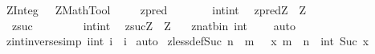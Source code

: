 %
\begin{isabellebody}%
\def\isabellecontext{ZInteg}%
%
\isamarkuptrue%
%
\isadelimtheory
%
\endisadelimtheory
%
\isatagtheory
{}\isamarkupfalse%
\ ZInteg\ \ \ ZMathTool\ %
\endisatagtheory
{\isafoldtheory}%
%
\isadelimtheory
%
\endisadelimtheory
\ \isanewline
\isanewline
{}\isamarkupfalse%
\isanewline
\ \ zpred\ \ \ \ \ \ \ {\isacharcolon}{\isacharcolon}\ {\isachardoublequoteopen}int{\isacharequal}{\isachargreater}int{\isachardoublequoteclose}\isanewline
\ \ {\isachardoublequoteopen}zpred{\isacharparenleft}Z{\isacharparenright}\ {\isacharequal}{\isacharequal}\ Z\ {\isacharminus}\ {}{\isachardoublequoteclose}\isanewline
\isanewline
\ \ zsuc\ \ \ \ \ \ \ \ {\isacharcolon}{\isacharcolon}\ {\isachardoublequoteopen}int{\isacharequal}{\isachargreater}int{\isachardoublequoteclose}\isanewline
\ \ {\isachardoublequoteopen}zsuc{\isacharparenleft}Z{\isacharparenright}\ {\isacharequal}{\isacharequal}\ Z\ {\isacharplus}\ {}{\isachardoublequoteclose}%
\isamarkuptrue%
\isamarkupfalse%
\ znat{\isacharunderscore}bin{\isacharunderscore}{}{\isacharcolon}\ {\isachardoublequoteopen}{\isacharparenleft}int\ {}{\isacharparenright}\ {\isacharequal}\ {}{\isachardoublequoteclose}\isanewline
%
\isadelimproof
%
\endisadelimproof
%
\isatagproof
{}\isamarkupfalse%
\ auto\isanewline
{}\isamarkupfalse%
%
\endisatagproof
{\isafoldproof}%
%
\isadelimproof
\isanewline
%
\endisadelimproof
\isanewline
{}\isamarkupfalse%
\ zint{\isacharunderscore}inverse{\isacharbrackleft}simp{\isacharbrackright}{\isacharcolon}\ {\isachardoublequoteopen}{\isachardollar}i{\isacharparenleft}int\ i{\isacharparenright}\ {\isacharequal}\ i{\isachardoublequoteclose}\isanewline
%
\isadelimproof
%
\endisadelimproof
%
\isatagproof
{}\isamarkupfalse%
\ auto\isanewline
{}\isamarkupfalse%
%
\endisatagproof
{\isafoldproof}%
%
\isadelimproof
\isanewline
%
\endisadelimproof
\isanewline
\isanewline
{}\isamarkupfalse%
\ zless{\isacharunderscore}def{\isacharunderscore}Suc{\isacharcolon}\ {\isachardoublequoteopen}{\isacharparenleft}n\ {\isacharless}\ m{\isacharparenright}\ {\isacharequal}\ {\isacharparenleft}{\isacharquery}\ x{\isachardot}\ m\ {\isacharequal}\ n\ {\isacharplus}\ int\ {\isacharparenleft}Suc\ x{\isacharparenright}{\isacharparenright}{\isachardoublequoteclose}\isanewline

\end{isabellebody}
